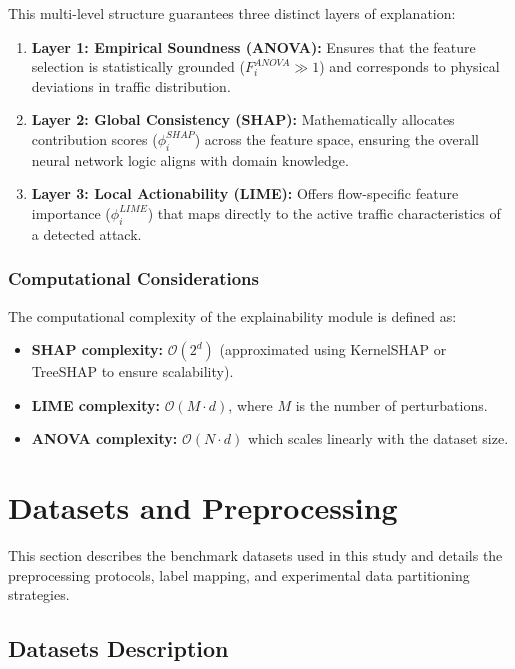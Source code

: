 \documentclass[a4paper,fleqn]{cas-sc}
\begin{document}
This multi-level structure guarantees three distinct layers of explanation:
\begin{enumerate}
    \item \textbf{Layer 1: Empirical Soundness (ANOVA):} Ensures that the feature selection is statistically grounded ($F_i^{ANOVA} \gg 1$) and corresponds to physical deviations in traffic distribution.
    \item \textbf{Layer 2: Global Consistency (SHAP):} Mathematically allocates contribution scores ($\phi_i^{SHAP}$) across the feature space, ensuring the overall neural network logic aligns with domain knowledge.
    \item \textbf{Layer 3: Local Actionability (LIME):} Offers flow-specific feature importance ($\phi_i^{LIME}$) that maps directly to the active traffic characteristics of a detected attack.
\end{enumerate}

\subsubsection{Computational Considerations}

The computational complexity of the explainability module is defined as:
\begin{itemize}
    \item \textbf{SHAP complexity:} $\mathcal{O}(2^d)$ (approximated using KernelSHAP or TreeSHAP to ensure scalability).
    \item \textbf{LIME complexity:} $\mathcal{O}(M \cdot d)$, where $M$ is the number of perturbations.
    \item \textbf{ANOVA complexity:} $\mathcal{O}(N \cdot d)$ which scales linearly with the dataset size.
\end{itemize}

\section{Datasets and Preprocessing}
\label{sec:datasets}

This section describes the benchmark datasets used in this study and details the preprocessing protocols, label mapping, and experimental data partitioning strategies.

\subsection{Datasets Description}
\end{document}
